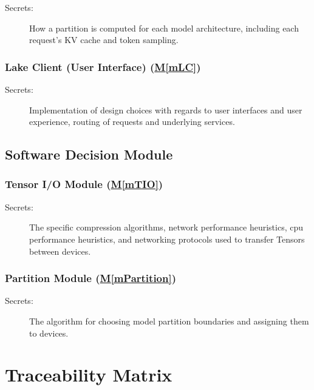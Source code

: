 \documentclass[12pt, titlepage]{article}
\newcommand{\mref}[1]{\hyperref[sec:#1]{M\ref*{#1}}}
\begin{document}
\begin{description}
\item[Secrets:] How a partition is computed for each model architecture,
  including each request's KV cache and token sampling.
\end{description}

\subsubsection{Lake Client (User Interface) (\mref{mLC})} \label{sec:mLC}

\begin{description}
\item[Secrets:] Implementation of design choices with regards to user interfaces and user experience,
routing of requests and underlying services.
\end{description}

\subsection{Software Decision Module}

\subsubsection{Tensor I/O Module (\mref{mTIO})} \label{sec:mTIO}
\begin{description}
	\item[Secrets:] The specific compression algorithms, network performance heuristics, cpu
		performance heuristics, and networking protocols used to transfer Tensors between devices.
\end{description}

\subsubsection{Partition Module (\mref{mPartition})}
\label{sec:mPartition}

\begin{description}
\item[Secrets:] The algorithm for choosing model
  partition boundaries and assigning them to devices.
\end{description}

\section{Traceability Matrix} \label{SecTM}
\end{document}
